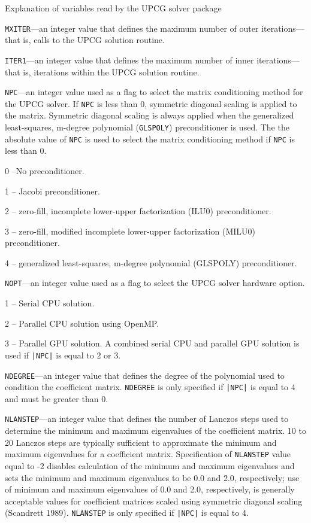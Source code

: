 \documentclass[12pt]{article} %
\begin{document}
\noindent Explanation of variables read by the UPCG solver package
\begin{description}

\item \texttt{MXITER}---an integer value that defines the maximum number of outer iterations—that is, calls to the UPCG solution routine.
\item \texttt{ITER1}---an integer value that defines the maximum number of inner iterations—that is, iterations within the UPCG solution routine.
\item \texttt{NPC}---an integer value used as a flag to select the matrix conditioning method for the UPCG solver. If \texttt{NPC} is less than 0, symmetric diagonal scaling is applied to the matrix. Symmetric diagonal scaling is always applied when the generalized least-squares, m-degree polynomial (\texttt{GLSPOLY}) preconditioner is used. The the absolute value of \texttt{NPC} is used to select the matrix conditioning method if \texttt{NPC} is less than 0.
\begin{description}
       \item 0 --No preconditioner.
       \item 1 -- Jacobi preconditioner.
       \item 2 -- zero-fill, incomplete lower-upper factorization (ILU0) preconditioner.
       \item 3 -- zero-fill, modified incomplete lower-upper factorization (MILU0) preconditioner.
       \item 4 -- generalized least-squares, m-degree polynomial (GLSPOLY) preconditioner.
\end{description}
\item \texttt{NOPT}---an integer value used as a flag to select the UPCG solver hardware option.
\begin{description}
       \item 1 -- Serial CPU solution.
       \item 2 -- Parallel CPU solution using OpenMP.
       \item 3 -- Parallel GPU solution. A combined serial CPU and parallel GPU solution is used if \texttt{|NPC|} is equal to 2 or 3.
\end{description}
\item \texttt{NDEGREE}---an integer value that defines the degree of the polynomial used to condition the coefficient matrix. \texttt{NDEGREE} is only specified if \texttt{|NPC|} is equal to 4 and must be greater than 0.
\item \texttt{NLANSTEP}---an integer value that defines the number of Lanczos steps used to determine the minimum and maximum eigenvalues of the coefficient matrix. 10 to 20 Lanczos steps are typically sufficient to approximate the minimum and maximum eigenvalues for a coefficient matrix. Specification of \texttt{NLANSTEP} value equal to -2 disables calculation of the minimum and maximum eigenvalues and sets the minimum and maximum eigenvalues to be 0.0 and 2.0, respectively; use of minimum and maximum eigenvalues of 0.0 and 2.0, respectively, is generally acceptable values for coefficient matrices scaled using symmetric diagonal scaling (Scandrett 1989). \texttt{NLANSTEP} is only specified if \texttt{|NPC|} is equal to 4.

\end{description}
\end{document}
